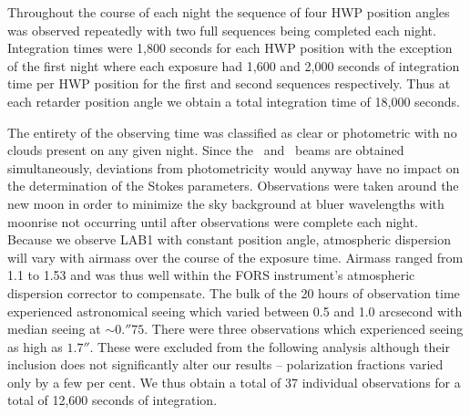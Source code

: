 Throughout the course of each night the sequence of four HWP position angles was observed repeatedly with two full sequences being completed each night. Integration times were 1,800 seconds for each HWP position with the exception of the first night where each exposure had 1,600 and 2,000 seconds of integration time per HWP position for the first and second sequences respectively. Thus at each retarder position angle we obtain a total integration time of 18,000 seconds. 

The entirety of the observing time was classified as clear or photometric with no clouds present on any given night. Since the \ord~and \ext~beams are obtained simultaneously, deviations from photometricity would anyway have no impact on the determination of the Stokes parameters. Observations were taken around the new moon in order to minimize the sky background at bluer wavelengths with moonrise not occurring until after observations were complete each night. Because we observe LAB1 with constant position angle, atmospheric dispersion will vary with airmass over the course of the exposure time. Airmass ranged from 1.1 to 1.53 and was thus well within the FORS instrument's atmospheric dispersion corrector to compensate.  The bulk of the 20 hours of observation time experienced astronomical seeing which varied between 0.5 and 1.0 arcsecond with median seeing at $\sim0.''75$. There were three observations which experienced seeing as high as $1.7''$. These were excluded from the following analysis although their inclusion does not significantly alter our results -- polarization fractions varied only by a few per cent. We thus obtain a total of 37 individual observations for a total of 12,600 seconds of integration.  

